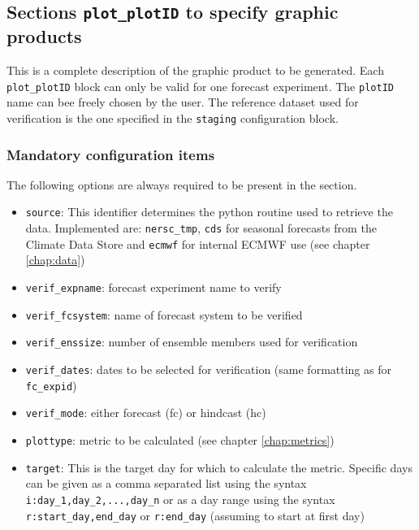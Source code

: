 \documentclass[DIV=10, parskip=full]{scrreprt}
\begin{document}
\subsection{Sections \texttt{plot\_plotID} to specify graphic products} \label{sec:plots}
This is a complete description of the graphic product to be generated. Each \texttt{plot\_plotID} block can only be valid for one forecast experiment. The \texttt{plotID} name can bee freely chosen by the user. The reference dataset used for verification is the one specified in the \texttt{staging} configuration block.

\subsubsection{Mandatory configuration items}
The following options are always required to be present in the section.
\begin{itemize}
	\item \texttt{source}: This identifier determines the python routine used to retrieve the data. Implemented are:  \texttt{nersc\_tmp}, \texttt{cds} for seasonal forecasts from the Climate Data Store and \texttt{ecmwf} for internal ECMWF use (see chapter \ref{chap:data})
	\item \texttt{verif\_expname}: forecast experiment name to verify
	\item \texttt{verif\_fcsystem}: name of forecast system to be verified
	\item \texttt{verif\_enssize}: number of ensemble members used for verification 
	\item \texttt{verif\_dates}: dates to be selected for verification (same formatting as for \texttt{fc\_expid})
	\item \texttt{verif\_mode}: either forecast (fc) or hindcast (hc)
	\item \texttt{plottype}: metric to be calculated (see chapter \ref{chap:metrics})
	\item \texttt{target}: This is the target day for which to calculate the metric. Specific days can be given as a comma separated list using the syntax \texttt{i:day\_1,day\_2,...,day\_n} or as a day range using the syntax \texttt{r:start\_day,end\_day} or \texttt{r:end\_day} (assuming to start at first day)
\end{itemize}
\end{document}
